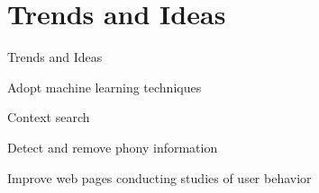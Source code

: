 \section{Trends and Ideas}

\begin{frame}{Trends and Ideas}

Adopt machine learning techniques \newline

Context search \newline

Detect and remove phony information \newline

Improve web pages conducting studies of user behavior \newline

\end{frame}
